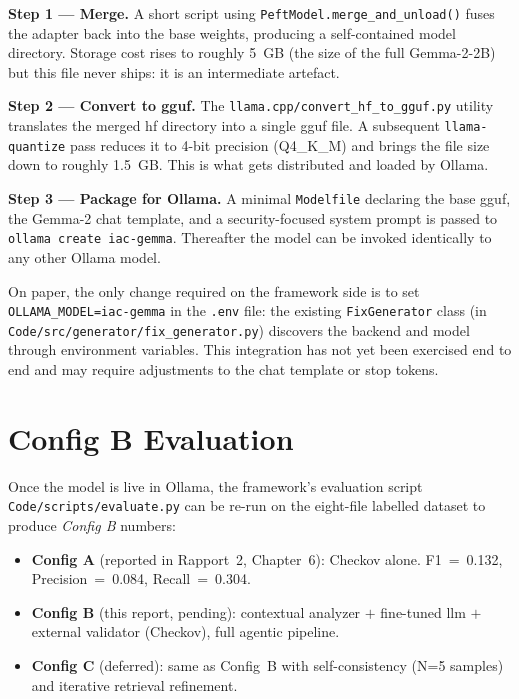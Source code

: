\documentclass[12pt, a4paper]{report}
\begin{document}
\textbf{Step 1 --- Merge.} A short script using
\texttt{PeftModel.merge\_and\_unload()} fuses the adapter back into the
base weights, producing a self-contained model directory. Storage cost
rises to roughly 5~GB (the size of the full Gemma-2-2B) but this file
never ships: it is an intermediate artefact.

\textbf{Step 2 --- Convert to \gls{gguf}.} The
\texttt{llama.cpp/convert\_hf\_to\_gguf.py} utility translates the merged
\gls{hf} directory into a single \gls{gguf} file. A subsequent
\texttt{llama-quantize} pass reduces it to 4-bit precision (Q4\_K\_M)
and brings the file size down to roughly 1.5~GB. This is what gets
distributed and loaded by Ollama.

\textbf{Step 3 --- Package for Ollama.} A minimal \texttt{Modelfile}
declaring the base \gls{gguf}, the Gemma-2 chat template, and a
security-focused system prompt is passed to \texttt{ollama create
iac-gemma}. Thereafter the model can be invoked identically to any
other Ollama model.

On paper, the only change required on the framework side is to set
\texttt{OLLAMA\_MODEL=iac-gemma} in the \texttt{.env} file: the existing
\texttt{FixGenerator} class (in \texttt{Code/src/generator/fix\_generator.py})
discovers the backend and model through environment variables.
This integration has not yet been exercised end to end and may require
adjustments to the chat template or stop tokens.

\section{Config B Evaluation}

Once the model is live in Ollama, the framework's evaluation script
\texttt{Code/scripts/evaluate.py} can be re-run on the eight-file
labelled dataset to produce \emph{Config B} numbers:

\begin{itemize}
  \item \textbf{Config A} (reported in Rapport~2, Chapter~6):
        Checkov alone. F1~=~0.132, Precision~=~0.084, Recall~=~0.304.
  \item \textbf{Config B} (this report, pending):
        contextual analyzer $+$ fine-tuned \gls{llm} $+$ external
        validator (Checkov), full agentic pipeline.
  \item \textbf{Config C} (deferred):
        same as Config~B with self-consistency (N=5 samples) and
        iterative retrieval refinement.
\end{itemize}
\end{document}
